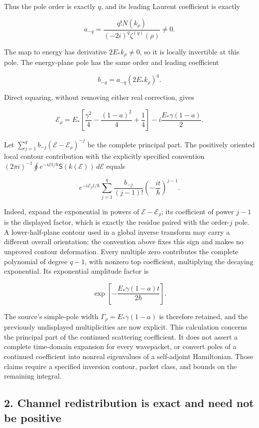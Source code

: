 Thus the pole order is exactly \(q\), and its leading Laurent
coefficient is exactly

\[
a_{-q}=
\frac{q!N(k_\rho)}{(-2i)^q\zeta^{(q)}(\rho)}\ne0.
\]

The map to energy has derivative \(2E_*k_\rho\ne0\), so it is locally
invertible at this pole. The energy-plane pole has the same order and
leading coefficient

\[
b_{-q}=a_{-q}(2E_*k_\rho)^q.
\]

Direct squaring, without removing either real correction, gives

\[
\mathcal E_\rho
=E_*\left[\frac{\gamma^2}{4}-\frac{(1-a)^2}{4}+\frac14\right]
-i\frac{E_*\gamma(1-a)}2.
\]

Let \(\sum_{j=1}^{q}b_{-j}(\mathcal E-\mathcal E_\rho)^{-j}\) be the
complete principal part. The positively oriented local contour
contribution with the explicitly specified convention
\((2\pi i)^{-1}\oint e^{-i\mathcal Et/\hbar}\mathsf S(k(\mathcal E))\,d\mathcal E\)
equals

\[
e^{-i\mathcal E_\rho t/\hbar}
\sum_{j=1}^{q}\frac{b_{-j}}{(j-1)!}
\left(-\frac{it}{\hbar}\right)^{j-1}.
\]

Indeed, expand the exponential in powers of
\(\mathcal E-\mathcal E_\rho\); its coefficient of power \(j-1\) is the
displayed factor, which is exactly the residue paired with the
order-\(j\) pole. A lower-half-plane contour used in a global inverse
transform may carry a different overall orientation; the convention
above fixes this sign and makes no unproved contour deformation. Every
multiple zero contributes the complete polynomial of degree \(q-1\),
with nonzero top coefficient, multiplying the decaying exponential. Its
exponential amplitude factor is

\[
\exp\!\left[-\frac{E_*\gamma(1-a)t}{2\hbar}\right].
\]

The source's simple-pole width \(\Gamma_\rho=E_*\gamma(1-a)\) is
therefore retained, and the previously undisplayed multiplicities are
now explicit. This calculation concerns the principal part of the
continued scattering coefficient. It does not assert a complete
time-domain expansion for every wavepacket, or convert poles of a
continued coefficient into nonreal eigenvalues of a self-adjoint
Hamiltonian. Those claims require a specified inversion contour, packet
class, and bounds on the remaining integral.

\subsection{2. Channel redistribution is exact and need not be
positive}\label{TranscriptStage:proof10:channel-redistribution-is-exact-and-need-not-be-positive}

